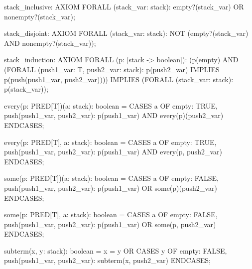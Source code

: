   stack_inclusive: AXIOM
    FORALL (stack_var: stack): empty?(stack_var) OR nonempty?(stack_var);

  stack_disjoint: AXIOM
    FORALL (stack_var: stack):
      NOT (empty?(stack_var) AND nonempty?(stack_var));

  stack_induction: AXIOM
    FORALL (p: [stack -> boolean]):
      (p(empty) AND
        (FORALL (push1_var: T, push2_var: stack):
           p(push2_var) IMPLIES p(push(push1_var, push2_var))))
       IMPLIES (FORALL (stack_var: stack): p(stack_var));

  every(p: PRED[T])(a: stack):  boolean =
      CASES a
        OF empty: TRUE,
           push(push1_var, push2_var): p(push1_var) AND every(p)(push2_var)
        ENDCASES;

  every(p: PRED[T], a: stack):  boolean =
      CASES a
        OF empty: TRUE,
           push(push1_var, push2_var): p(push1_var) AND every(p, push2_var)
        ENDCASES;

  some(p: PRED[T])(a: stack):  boolean =
      CASES a
        OF empty: FALSE,
           push(push1_var, push2_var): p(push1_var) OR some(p)(push2_var)
        ENDCASES;

  some(p: PRED[T], a: stack):  boolean =
      CASES a
        OF empty: FALSE,
           push(push1_var, push2_var): p(push1_var) OR some(p, push2_var)
        ENDCASES;

  subterm(x, y: stack):  boolean =
      x = y OR
       CASES y
         OF empty: FALSE, push(push1_var, push2_var): subterm(x, push2_var)
         ENDCASES;
